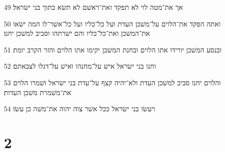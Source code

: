 \par 49 אך את־מטה לוי לא תפקד ואת־ראשׁם לא תשׂא בתוך בני ישׂראל׃
\par 50 ואתה הפקד את־הלוים על־משׁכן העדת ועל כל־כליו ועל כל־אשׁר־לו המה ישׂאו את־המשׁכן ואת־כל־כליו והם ישׁרתהו וסביב למשׁכן יחנו׃
\par 51 ובנסע המשׁכן יורידו אתו הלוים ובחנת המשׁכן יקימו אתו הלוים והזר הקרב יומת׃
\par 52 וחנו בני ישׂראל אישׁ על־מחנהו ואישׁ על־דגלו לצבאתם׃
\par 53 והלוים יחנו סביב למשׁכן העדת ולא־יהיה קצף על־עדת בני ישׂראל ושׁמרו הלוים את־משׁמרת משׁכן העדות׃
\par 54 ויעשׂו בני ישׂראל ככל אשׁר צוה יהוה את־משׁה כן עשׂו׃

\chapter{2}


